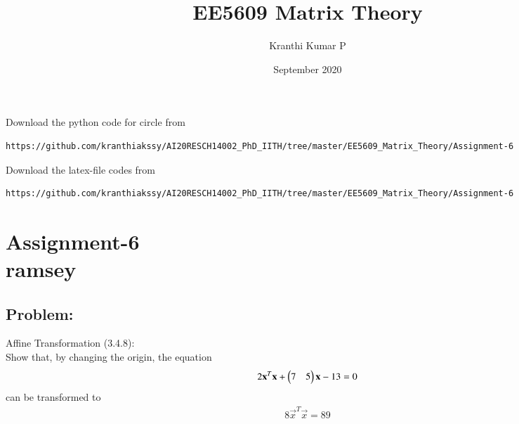 \documentclass[journal,12pt,twocolumn]{IEEEtran}
\begin{document}
     \def\rightbox#1{\makebox[0in][r]{#1}}
     \def\centbox#1{\makebox[0in]{#1}}
     \def\topbox#1{\raisebox{-\baselineskip}[0in][0in]{#1}}
     \def\midbox#1{\raisebox{-0.5\baselineskip}[0in][0in]{#1}}
\vspace{3cm}
\title{EE5609 Matrix Theory}
\author{Kranthi Kumar P}
\date{September 2020}
\maketitle
\newpage
\bigskip
\renewcommand{\thefigure}{\theenumi}
\renewcommand{\thetable}{\theenumi}
Download the python code for circle from 
\begin{lstlisting}
https://github.com/kranthiakssy/AI20RESCH14002_PhD_IITH/tree/master/EE5609_Matrix_Theory/Assignment-6
\end{lstlisting}

Download the latex-file codes from 
%
\begin{lstlisting}
https://github.com/kranthiakssy/AI20RESCH14002_PhD_IITH/tree/master/EE5609_Matrix_Theory/Assignment-6
\end{lstlisting}
\section*{Assignment-6\\ramsey}
\subsection*{Problem:}
Affine Transformation (3.4.8):\\
Show that, by changing the origin, the equation
\begin{align}
2\mathbf{x}^T\mathbf{x}+\begin{pmatrix}7&5\end{pmatrix}\mathbf{x}-13=0
\label{eq:a0}
\end{align}
can be transformed to
\begin{align}
8\vec{x}^T\vec{x}=89
\label{eq:a1}
\end{align}
\end{document}
